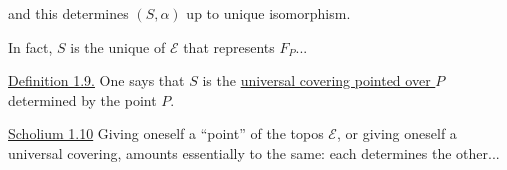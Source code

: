 and this determines \((S,\alpha)\) up to unique isomorphism.

In fact, \(S\) is the unique 
of \(\mathcal E\) that represents \(F_P\)...

\uline{Definition 1.9.} One says that \(S\)
 is the
\uline{universal covering pointed over \(P\)} determined
by the point \(P\).

\uline{Scholium 1.10} Giving oneself a ``point'' of the \unsure{:}
 topos \(\mathcal E\), or giving oneself a
universal covering, amounts essentially to the
same: each determines the other...